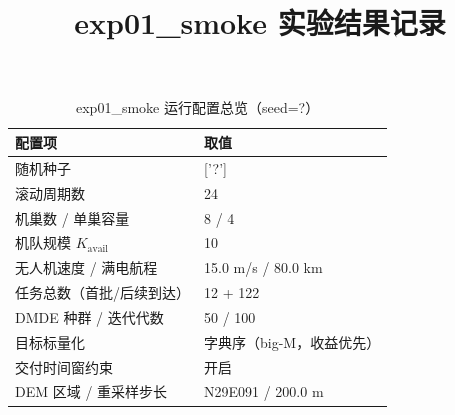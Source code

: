 \documentclass[a4paper,11pt]{article}
\begin{document}
\title{exp01\_smoke 实验结果记录}

\maketitle

\begin{table}[htbp]\centering
\caption{exp01\_smoke 运行配置总览（seed=?）}
\label{tab:exp01-config}
\begin{tabular}{ll}
\toprule
配置项 & 取值 \\
\midrule
随机种子 & ['?'] \\
滚动周期数 & 24 \\
机巢数 / 单巢容量 & 8 / 4 \\
机队规模 $K_{\mathrm{avail}}$ & 10 \\
无人机速度 / 满电航程 & 15.0 m/s / 80.0 km \\
任务总数（首批/后续到达） & 12 + 122 \\
DMDE 种群 / 迭代代数 & 50 / 100 \\
目标标量化 & 字典序（big-M，收益优先） \\
交付时间窗约束 & 开启 \\
DEM 区域 / 重采样步长 & N29E091 / 200.0 m \\
\bottomrule
\end{tabular}
\end{table}
\end{document}
